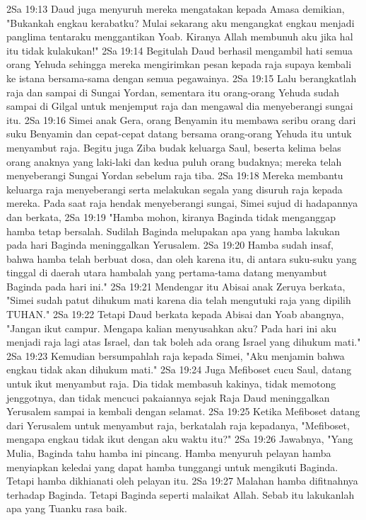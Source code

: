 2Sa 19:13  Daud juga menyuruh mereka mengatakan kepada Amasa demikian, "Bukankah engkau kerabatku? Mulai sekarang aku mengangkat engkau menjadi panglima tentaraku menggantikan Yoab. Kiranya Allah membunuh aku jika hal itu tidak kulakukan!"
2Sa 19:14  Begitulah Daud berhasil mengambil hati semua orang Yehuda sehingga mereka mengirimkan pesan kepada raja supaya kembali ke istana bersama-sama dengan semua pegawainya.
2Sa 19:15  Lalu berangkatlah raja dan sampai di Sungai Yordan, sementara itu orang-orang Yehuda sudah sampai di Gilgal untuk menjemput raja dan mengawal dia menyeberangi sungai itu.
2Sa 19:16  Simei anak Gera, orang Benyamin itu membawa seribu orang dari suku Benyamin dan cepat-cepat datang bersama orang-orang Yehuda itu untuk menyambut raja. Begitu juga Ziba budak keluarga Saul, beserta kelima belas orang anaknya yang laki-laki dan kedua puluh orang budaknya; mereka telah menyeberangi Sungai Yordan sebelum raja tiba.
2Sa 19:18  Mereka membantu keluarga raja menyeberangi serta melakukan segala yang disuruh raja kepada mereka. Pada saat raja hendak menyeberangi sungai, Simei sujud di hadapannya dan berkata,
2Sa 19:19  "Hamba mohon, kiranya Baginda tidak menganggap hamba tetap bersalah. Sudilah Baginda melupakan apa yang hamba lakukan pada hari Baginda meninggalkan Yerusalem.
2Sa 19:20  Hamba sudah insaf, bahwa hamba telah berbuat dosa, dan oleh karena itu, di antara suku-suku yang tinggal di daerah utara hambalah yang pertama-tama datang menyambut Baginda pada hari ini."
2Sa 19:21  Mendengar itu Abisai anak Zeruya berkata, "Simei sudah patut dihukum mati karena dia telah mengutuki raja yang dipilih TUHAN."
2Sa 19:22  Tetapi Daud berkata kepada Abisai dan Yoab abangnya, "Jangan ikut campur. Mengapa kalian menyusahkan aku? Pada hari ini aku menjadi raja lagi atas Israel, dan tak boleh ada orang Israel yang dihukum mati."
2Sa 19:23  Kemudian bersumpahlah raja kepada Simei, "Aku menjamin bahwa engkau tidak akan dihukum mati."
2Sa 19:24  Juga Mefiboset cucu Saul, datang untuk ikut menyambut raja. Dia tidak membasuh kakinya, tidak memotong jenggotnya, dan tidak mencuci pakaiannya sejak Raja Daud meninggalkan Yerusalem sampai ia kembali dengan selamat.
2Sa 19:25  Ketika Mefiboset datang dari Yerusalem untuk menyambut raja, berkatalah raja kepadanya, "Mefiboset, mengapa engkau tidak ikut dengan aku waktu itu?"
2Sa 19:26  Jawabnya, "Yang Mulia, Baginda tahu hamba ini pincang. Hamba menyuruh pelayan hamba menyiapkan keledai yang dapat hamba tunggangi untuk mengikuti Baginda. Tetapi hamba dikhianati oleh pelayan itu.
2Sa 19:27  Malahan hamba difitnahnya terhadap Baginda. Tetapi Baginda seperti malaikat Allah. Sebab itu lakukanlah apa yang Tuanku rasa baik.
